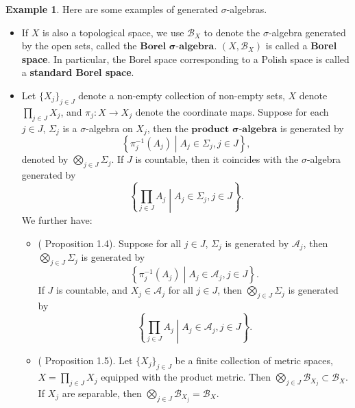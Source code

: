 \documentclass[openany]{book}
\theoremstyle{definition}
\newtheorem{example}{Example}[chapter]
\theoremstyle{remark}
\begin{document}
\begin{example}
    Here are some examples of generated $\sigma$-algebras.
    \begin{itemize}
        \item If $X$ is also a topological space, we use $\mathcal{B}_X$ to denote the $\sigma$-algebra generated by the open sets, called the $\textbf{Borel }\boldsymbol{\sigma}\textbf{-algebra}$. $(X,\mathcal{B}_X)$ is called a \textbf{Borel space}. In particular, the Borel space corresponding to a Polish space is called a \textbf{standard Borel space}.

        \item Let $\{X_j\}_{j\in J}$ denote a non-empty collection of non-empty sets, $X$ denote $\prod_{j\in J}X_j$, and $\pi_j:X\to X_j$ denote the coordinate maps. Suppose for each $j\in J$, $\Sigma_j$ is a $\sigma$-algebra on $X_j$, then the $\textbf{product }\boldsymbol{\sigma}\textbf{-algebra}$ is generated by
        \begin{equation*}
            \left\{\pi_j^{-1}(A_j)\middle|A_j\in\Sigma_j,j\in J\right\},
        \end{equation*}
        denoted by $\bigotimes_{j\in J}\Sigma_j$. If $J$ is countable, then it coincides with the $\sigma$-algebra generated by
        \begin{equation*}
            \left\{\prod_{j\in J}A_j\middle|A_j\in\Sigma_j,j\in J\right\}.
        \end{equation*}
        We further have:
        \begin{itemize}
            \item (\cite{F13} Proposition 1.4). Suppose for all $j\in J$, $\Sigma_j$ is generated by $\mathcal{A}_j$, then $\bigotimes_{j\in J}\Sigma_j$ is generated by
            \begin{equation*}
                \left\{\pi_j^{-1}(A_j)\middle|A_j\in \mathcal{A}_j,j\in J\right\}.
            \end{equation*}
            If $J$ is countable, and $X_j\in \mathcal{A}_j$ for all $j\in J$, then $\bigotimes_{j\in J}\Sigma_j$ is generated by
            \begin{equation*}
                \left\{\prod_{j\in J}A_j\middle|A_j\in \mathcal{A}_j,j\in J\right\}.
            \end{equation*}

            \item (\cite{F13} Proposition 1.5). Let $\{X_j\}_{j\in J}$ be a finite collection of metric spaces, $X=\prod_{j\in J}X_j$ equipped with the product metric. Then $\bigotimes_{j\in J}\mathcal{B}_{X_j}\subset \mathcal{B}_X$. If $X_j$ are separable, then $\bigotimes_{j\in J}\mathcal{B}_{X_j}=\mathcal{B}_X$.
        \end{itemize}
    \end{itemize}
\end{example}
\end{document}
